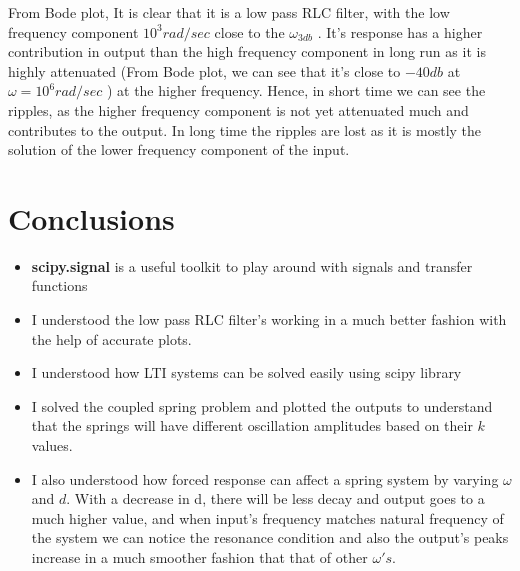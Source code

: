 \documentclass[12pt, a4paper]{report}
\begin{document}
From Bode plot, It is clear that it is a low pass RLC filter, with the low frequency component $10^3 rad/sec$ close to the  $\omega_{3db}$ . It's response has a higher contribution in output than the high frequency component in long run as it is highly attenuated (From Bode plot, we can see that it's close to $-40db$ at $\omega = 10^6 rad/sec$  ) at the higher frequency. Hence, in short time we can see the ripples, as the higher frequency component is not yet attenuated much and contributes to the output. In long time the ripples are lost as it is mostly the solution of the lower frequency component of the input.



\section*{Conclusions}
\begin{itemize}
	\item \textbf{scipy.signal} is a useful toolkit to play around with signals and transfer functions
	\item I understood the low pass RLC filter's working in a much better fashion with the help of accurate plots.
	\item I understood how LTI systems can be solved easily using scipy library
	\item I solved the coupled spring problem and plotted the outputs to understand that the springs will have different oscillation amplitudes based on their $k$ values.
	\item I also understood how forced response can affect a spring system by varying $\omega$ and $d$. With a decrease in d, there will be less decay and output goes to a much higher value, and when input's frequency matches natural frequency of the system we can notice the resonance condition and also the output's peaks increase in a much smoother fashion that that of other $\omega's$.
	
\end{itemize}
\end{document}
